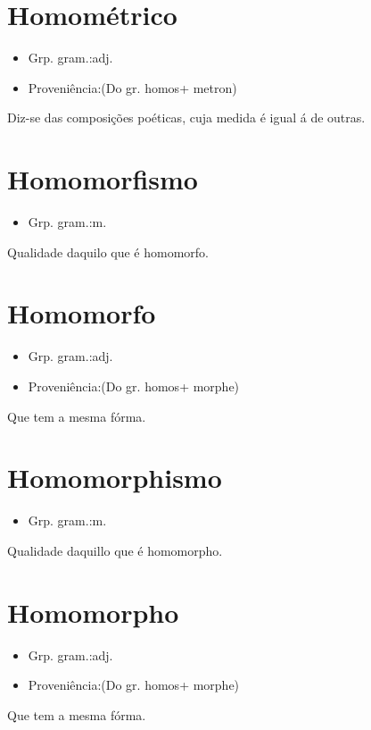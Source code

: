 \documentclass{article}
\begin{document}
\section{Homométrico}
\begin{itemize}
\item {Grp. gram.:adj.}
\end{itemize}
\begin{itemize}
\item {Proveniência:(Do gr. \textunderscore homos\textunderscore  + \textunderscore metron\textunderscore )}
\end{itemize}
Diz-se das composições poéticas, cuja medida é igual á de outras.
\section{Homomorfismo}
\begin{itemize}
\item {Grp. gram.:m.}
\end{itemize}
Qualidade daquilo que é homomorfo.
\section{Homomorfo}
\begin{itemize}
\item {Grp. gram.:adj.}
\end{itemize}
\begin{itemize}
\item {Proveniência:(Do gr. \textunderscore homos\textunderscore  + \textunderscore morphe\textunderscore )}
\end{itemize}
Que tem a mesma fórma.
\section{Homomorphismo}
\begin{itemize}
\item {Grp. gram.:m.}
\end{itemize}
Qualidade daquillo que é homomorpho.
\section{Homomorpho}
\begin{itemize}
\item {Grp. gram.:adj.}
\end{itemize}
\begin{itemize}
\item {Proveniência:(Do gr. \textunderscore homos\textunderscore  + \textunderscore morphe\textunderscore )}
\end{itemize}
Que tem a mesma fórma.
\end{document}

